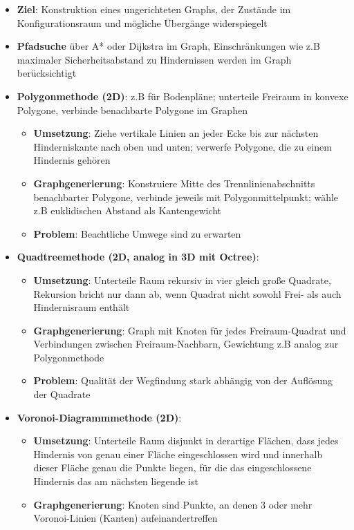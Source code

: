 \begin{itemize}
	\item \textbf{Ziel}: Konstruktion eines ungerichteten Graphs, der Zustände im Konfigurationsraum und mögliche Übergänge widerspiegelt
	\item \textbf{Pfadsuche} über A* oder Dijkstra im Graph, Einschränkungen wie z.B maximaler Sicherheitsabstand zu Hindernissen werden im Graph berücksichtigt
	\item \textbf{Polygonmethode (2D)}: z.B für Bodenpläne; unterteile Freiraum in konvexe Polygone, verbinde benachbarte Polygone im Graphen
	\begin{itemize}
		\item \textbf{Umsetzung}: Ziehe vertikale Linien an jeder Ecke bis zur nächsten Hinderniskante nach oben und unten; verwerfe Polygone, die zu einem Hindernis gehören
		\item \textbf{Graphgenerierung}: Konstruiere Mitte des Trennlinienabschnitts benachbarter Polygone, verbinde jeweils mit Polygonmittelpunkt; wähle z.B euklidischen Abstand als Kantengewicht
		\item \textbf{Problem}: Beachtliche Umwege sind zu erwarten
	\end{itemize}
	\item \textbf{Quadtreemethode (2D, analog in 3D mit Octree)}:
	\begin{itemize}
		\item \textbf{Umsetzung}: Unterteile Raum rekursiv in vier gleich große Quadrate, Rekursion bricht nur dann ab, wenn Quadrat nicht sowohl Frei- als auch Hindernisraum enthält
		\item \textbf{Graphgenerierung}: Graph mit Knoten für jedes Freiraum-Quadrat und Verbindungen zwischen Freiraum-Nachbarn, Gewichtung z.B analog zur Polygonmethode
		\item \textbf{Problem}: Qualität der Wegfindung stark abhängig von der Auflösung der Quadrate
	\end{itemize}
	\item \textbf{Voronoi-Diagrammmethode (2D)}:
	\begin{itemize}
		\item \textbf{Umsetzung}: Unterteile Raum disjunkt in derartige Flächen, dass jedes Hindernis von genau einer Fläche eingeschlossen wird und innerhalb dieser Fläche genau die Punkte liegen, für die das eingeschlossene Hindernis das am nächsten liegende ist
		\item \textbf{Graphgenerierung}: Knoten sind Punkte, an denen 3 oder mehr Voronoi-Linien (Kanten) aufeinandertreffen

\end{itemize}
\end{itemize}

